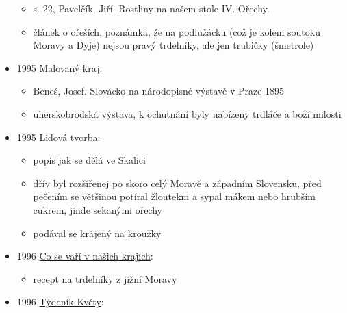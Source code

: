 \begin{itemize}
  \begin{itemize}
  \tightlist
  \item
    s. 22, Pavelčík, Jiří. Rostliny na našem stole IV. Ořechy.
  \item
    článek o ořeších, poznámka, že na podlužácku (což je kolem soutoku
    Moravy a Dyje) nejsou pravý trdelníky, ale jen trubičky (šmetrole)
  \end{itemize}
\item
  1995
  \href{https://ceskadigitalniknihovna.cz/uuid/uuid:0f104c60-3fbe-11e4-b6b9-001018b5eb5c}{Malovaný
  kraj}:

  \begin{itemize}
  \tightlist
  \item
    Beneš, Josef. Slovácko na národopisné výstavě v Praze 1895
  \item
    uherskobrodská výstava, k ochutnání byly nabízeny trdláče a boží
    milosti
  \end{itemize}
\item
  1995
  \href{https://ceskadigitalniknihovna.cz/uuid/uuid:3cd53df2-ab22-431c-b169-618cc63f3ce6}{Lidová
  tvorba}:

  \begin{itemize}
  \tightlist
  \item
    popis jak se dělá ve Skalici
  \item
    dřív byl rozšířenej po skoro celý Moravě a západním Slovensku, před
    pečením se většinou potíral žloutekm a sypal mákem nebo hrubším
    cukrem, jinde sekanými ořechy
  \item
    podával se krájený na kroužky
  \end{itemize}
\item
  1996
  \href{https://ceskadigitalniknihovna.cz/view/uuid:f7075980-dd45-11ee-bb18-0050568d319f?page=uuid\%3A38f6bbbd-dd95-47e5-b29c-ef351dec4c15&fulltext=trdeln\%C3\%ADk\%20OR\%20trdeln\%C3\%ADky\%20OR\%20trdeln\%C3\%ADk\%C5\%AF&source=mzk}{Co
  se vaří v našich krajích}:

  \begin{itemize}
  \tightlist
  \item
    recept na trdelníky z jižní Moravy
  \end{itemize}
\item
  1996
  \href{https://ceskadigitalniknihovna.cz/uuid/uuid:df7cfd60-8b4d-11e3-aa9f-5ef3fc9ae867}{Týdeník
  Květy}:


\end{itemize}
